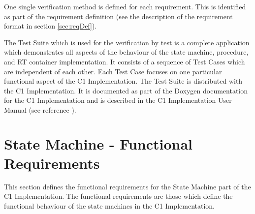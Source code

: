 \documentclass[a4paper,10pt]{article}
\let\stdsection\section
\renewcommand\section{\newpage\stdsection}
\begin{document}
One single verification method is defined for each requirement. 
This is identified as part of the requirement definition (see the description of the requirement format in section \ref{sec:reqDef}).

The Test Suite which is used for the verification by test is a complete application which demonstrates all aspects 
of the behaviour of the state machine, procedure, and RT container implementation. 
It consists of a sequence of Test Cases which are independent of each other. 
Each Test Case focuses on one particular functional aspect of the C1 Implementation. 
The Test Suite is distributed with the C1 Implementation.
It is documented as part of the Doxygen documentation for the C1 Implementation and is described in the C1 Implementation User Manual (see reference \cite{ref:um}).


\let\stdsubsection\subsection
\renewcommand\subsection{\newpage\stdsubsection}


\section{State Machine - Functional Requirements}\label{sec:smFncReqs}
This section defines the functional requirements for the State Machine part of the C1 Implementation. 
The functional requirements are those which define the functional behaviour of the state machines in the C1 Implementation.

\end{document}
